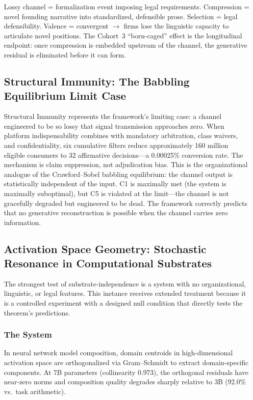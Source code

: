 \documentclass[12pt,letterpaper]{article}
\theoremstyle{definition}
\theoremstyle{remark}
\begin{document}
Lossy channel = formalization event imposing legal requirements. Compression = novel founding narrative into standardized, defensible prose. Selection = legal defensibility. Valence = convergent $\to$ firms lose the linguistic capacity to articulate novel positions. The Cohort~3 ``born-caged'' effect is the longitudinal endpoint: once compression is embedded upstream of the channel, the generative residual is eliminated before it can form.


\subsection{Structural Immunity: The Babbling Equilibrium Limit Case}

Structural Immunity represents the framework's limiting case: a channel engineered to be so lossy that signal transmission approaches zero. When platform indispensability combines with mandatory arbitration, class waivers, and confidentiality, six cumulative filters reduce approximately 160 million eligible consumers to 32 affirmative decisions---a 0.00025\% conversion rate. The mechanism is claim suppression, not adjudication bias. This is the organizational analogue of the Crawford--Sobel babbling equilibrium: the channel output is statistically independent of the input. C1 is maximally met (the system is maximally suboptimal), but C5 is violated at the limit---the channel is not gracefully degraded but engineered to be dead. The framework correctly predicts that no generative reconstruction is possible when the channel carries zero information.


\subsection{Activation Space Geometry: Stochastic Resonance in Computational Substrates}

The strongest test of substrate-independence is a system with no organizational, linguistic, or legal features. This instance receives extended treatment because it is a controlled experiment with a designed null condition that directly tests the theorem's predictions.

\subsubsection{The System}

In neural network model composition, domain centroids in high-dimensional activation space are orthogonalized via Gram--Schmidt to extract domain-specific components. At 7B parameters (collinearity 0.973), the orthogonal residuals have near-zero norms and composition quality degrades sharply relative to 3B (92.0\% vs.\ task arithmetic).
\end{document}
